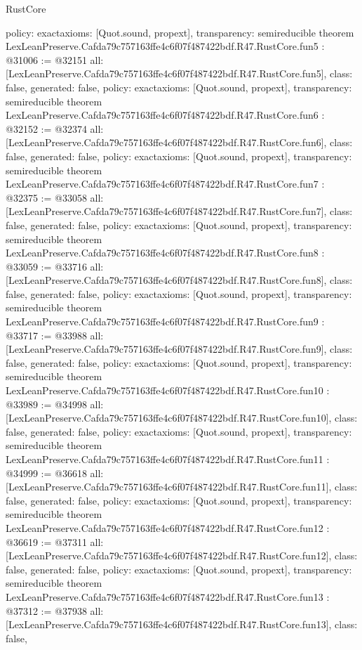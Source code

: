 \begin{lexlean}{RustCore}
\begin{coremodule}
{  policy: exact{axioms: [Quot.sound, propext]},
  transparency: semireducible
}
theorem LexLeanPreserve.Cafda79c757163ffe4c6f07f487422bdf.R47.RustCore.fun5 : @31006 := @32151 {
  all: [LexLeanPreserve.Cafda79c757163ffe4c6f07f487422bdf.R47.RustCore.fun5],
  class: false,
  generated: false,
  policy: exact{axioms: [Quot.sound, propext]},
  transparency: semireducible
}
theorem LexLeanPreserve.Cafda79c757163ffe4c6f07f487422bdf.R47.RustCore.fun6 : @32152 := @32374 {
  all: [LexLeanPreserve.Cafda79c757163ffe4c6f07f487422bdf.R47.RustCore.fun6],
  class: false,
  generated: false,
  policy: exact{axioms: [Quot.sound, propext]},
  transparency: semireducible
}
theorem LexLeanPreserve.Cafda79c757163ffe4c6f07f487422bdf.R47.RustCore.fun7 : @32375 := @33058 {
  all: [LexLeanPreserve.Cafda79c757163ffe4c6f07f487422bdf.R47.RustCore.fun7],
  class: false,
  generated: false,
  policy: exact{axioms: [Quot.sound, propext]},
  transparency: semireducible
}
theorem LexLeanPreserve.Cafda79c757163ffe4c6f07f487422bdf.R47.RustCore.fun8 : @33059 := @33716 {
  all: [LexLeanPreserve.Cafda79c757163ffe4c6f07f487422bdf.R47.RustCore.fun8],
  class: false,
  generated: false,
  policy: exact{axioms: [Quot.sound, propext]},
  transparency: semireducible
}
theorem LexLeanPreserve.Cafda79c757163ffe4c6f07f487422bdf.R47.RustCore.fun9 : @33717 := @33988 {
  all: [LexLeanPreserve.Cafda79c757163ffe4c6f07f487422bdf.R47.RustCore.fun9],
  class: false,
  generated: false,
  policy: exact{axioms: [Quot.sound, propext]},
  transparency: semireducible
}
theorem LexLeanPreserve.Cafda79c757163ffe4c6f07f487422bdf.R47.RustCore.fun10 : @33989 := @34998 {
  all: [LexLeanPreserve.Cafda79c757163ffe4c6f07f487422bdf.R47.RustCore.fun10],
  class: false,
  generated: false,
  policy: exact{axioms: [Quot.sound, propext]},
  transparency: semireducible
}
theorem LexLeanPreserve.Cafda79c757163ffe4c6f07f487422bdf.R47.RustCore.fun11 : @34999 := @36618 {
  all: [LexLeanPreserve.Cafda79c757163ffe4c6f07f487422bdf.R47.RustCore.fun11],
  class: false,
  generated: false,
  policy: exact{axioms: [Quot.sound, propext]},
  transparency: semireducible
}
theorem LexLeanPreserve.Cafda79c757163ffe4c6f07f487422bdf.R47.RustCore.fun12 : @36619 := @37311 {
  all: [LexLeanPreserve.Cafda79c757163ffe4c6f07f487422bdf.R47.RustCore.fun12],
  class: false,
  generated: false,
  policy: exact{axioms: [Quot.sound, propext]},
  transparency: semireducible
}
theorem LexLeanPreserve.Cafda79c757163ffe4c6f07f487422bdf.R47.RustCore.fun13 : @37312 := @37938 {
  all: [LexLeanPreserve.Cafda79c757163ffe4c6f07f487422bdf.R47.RustCore.fun13],
  class: false,
}
\end{coremodule}
\end{lexlean}
